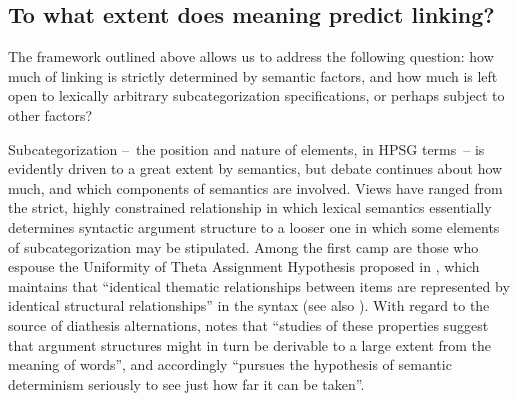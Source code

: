 \documentclass[output=paper,biblatex,babelshorthands,newtxmath,draftmode,colorlinks, citecolor=brown]{langscibook}
\begin{document}
\subsection{To what extent does meaning predict linking?}

The framework outlined above allows us to address the following question: how much of linking is strictly determined by semantic factors, and how much is left open to 
lexically arbitrary subcategorization specifications, or perhaps subject to other factors?

Subcategorization --~the position and nature of \argst elements, in HPSG terms~-- is evidently driven to a great extent by semantics,
but debate continues about how much, and which components of semantics are involved.
Views have ranged from the strict, highly constrained relationship in which lexical semantics essentially determines syntactic argument structure to a looser one in which some elements of subcategorization may be stipulated.
Among  the first camp are those who espouse the Uniformity of Theta Assignment
Hypothesis  proposed in \citet[46]{Baker1988}, which maintains that ``identical thematic relationships between items are represented by identical structural relationships'' in the syntax (see also \citealt{Baker1997}).
With regard to the source of diathesis alternations,
\citet[12--13]{Levin1993} notes that ``studies of these properties suggest that argument structures
might in turn be derivable to a large extent from the meaning of words'', and accordingly ``pursues
the hypothesis of semantic determinism seriously to see just how far it can be taken''. 
\end{document}
